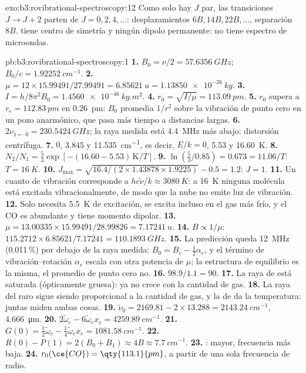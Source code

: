 \begin{solution}{exo:b3:rovibrational-spectroscopy:12}
Como solo hay $J$ par, las transiciones $J \to J + 2$ parten de $J = 0, 2, 4, \dots$: desplazamientos
$6B, 14B, 22B, \dots$, separación $8B$.  tiene centro de simetría y ningún
dipolo permanente: no tiene espectro de microondas.
\end{solution}

\begin{solution}{pb:b3:rovibrational-spectroscopy:1}
\textbf{1.} $B_0 = \nu/2 = \qty{57.6356}{GHz}$; $B_0/c = \qty{1.92252}{cm^{-1}}$.
\textbf{2.} $\mu = 12 \times 15.99491/27.99491 = \qty{6.85621}{u} = \qty{1.13850e-26}{kg}$.
\textbf{3.} $I = h/8\pi^2B_0 = \qty{1.4560e-46}{kg.m^2}$.
\textbf{4.} $r_0 = \sqrt{I/\mu} = \qty{113.09}{pm}$.
\textbf{5.} $r_0$ supera a $r_e = \qty{112.83}{pm}$ en \qty{0.26}{pm}: $B_0$ promedia $1/r^2$
sobre la vibración de punto cero en un pozo anarmónico, que pasa más tiempo
a distancias largas.
\textbf{6.} $2\nu_{1\leftarrow0} = \qty{230.5424}{GHz}$; la raya medida está \qty{4.4}{MHz} más abajo:
distorsión centrífuga.
\textbf{7.} $0$, 3.845 y \qty{11.535}{cm^{-1}}, es decir, $E/k = 0$, 5.53 y \qty{16.60}{K}.
\textbf{8.} $N_2/N_1 = \frac53\exp[-(16.60 - 5.53)\,\mathrm K/T]$.
\textbf{9.} $\ln(\frac53/0.85) = 0.673 = 11.06/T$: $T = \qty{16}{K}$.
\textbf{10.} $J_{\max} = \sqrt{16.4/(2 \times 1.43878 \times 1.9225)} - 0.5 = 1.2$: $J = 1$.
\textbf{11.} Un cuanto de vibración corresponde a $hc\tilde\nu/k \approx \qty{3080}{K}$: a
\qty{16}{K} ninguna molécula está excitada vibracionalmente, de modo que la nube no emite luz
de vibración.
\textbf{12.} Solo necesita \qty{5.5}{K} de excitación, se excita incluso en el gas
más frío, y el CO es abundante y tiene momento dipolar.
\textbf{13.} $\mu = 13.00335 \times 15.99491/28.99826 = \qty{7.17241}{u}$.
\textbf{14.} $B \propto 1/\mu$: $115.2712 \times 6.85621/7.17241 = \qty{110.1893}{GHz}$.
\textbf{15.} La predicción queda \qty{12}{MHz} (0.011\,\%) por debajo de la raya medida: $B_0 = B_e - \frac12\alpha_e$, y el
término de vibración--rotación $\alpha_e$ escala con otra potencia de $\mu$; la
estructura de equilibrio es la misma, el promedio de punto cero no.
\textbf{16.} $98.9/1.1 = 90$.
\textbf{17.} La raya de  está saturada (ópticamente gruesa): ya no
crece con la cantidad de gas.
\textbf{18.} La raya del raro  sigue siendo proporcional a la cantidad de gas, y la de
 da la temperatura: juntas miden ambas cosas.
\textbf{19.} $\tilde\nu_0 = 2169.81 - 2 \times 13.288 = \qty{2143.24}{cm^{-1}}$, \qty{4.666}{\micro m}.
\textbf{20.} $2\tilde\omega_e - 6\tilde\omega_ex_e = \qty{4259.89}{cm^{-1}}$.
\textbf{21.} $G(0) = \frac12\tilde\omega_e - \frac14\tilde\omega_ex_e = \qty{1081.58}{cm^{-1}}$.
\textbf{22.} $R(0) - P(1) = 2(B_0 + B_1) \approx 4B \approx \qty{7.7}{cm^{-1}}$.
\textbf{23.} :  mayor, frecuencia más baja.
\textbf{24.} \textbf{$r_0(\ce{CO}) = \qty{113.1}{pm}$}, a partir de una sola frecuencia de radio.
\end{solution}
